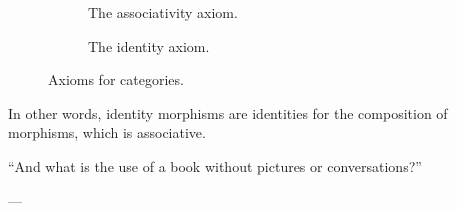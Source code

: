 \begin{definition}
\begin{itemize}
\begin{figure}
\begin{subfigure}[b]{0.5\linewidth}
\begin{center}
        \end{center}
        \caption{The associativity axiom.}
        \label{fig:category-associativity}
      \end{subfigure}
      \begin{subfigure}[b]{0.5\linewidth}
        \begin{center}
        \end{center}
        \caption{The identity axiom.}
        \label{fig:category-identity}
      \end{subfigure}
      \caption{Axioms for categories.}
      \label{fig:category-axioms}
    \end{figure}

  \end{itemize}
  In other words, identity morphisms are identities for the
  composition of morphisms, which is associative.

\end{definition}

\epigraph{
  ``And what is the use of a book without pictures or conversations?''
}{---\textcite[13]{carroll-2004}}

